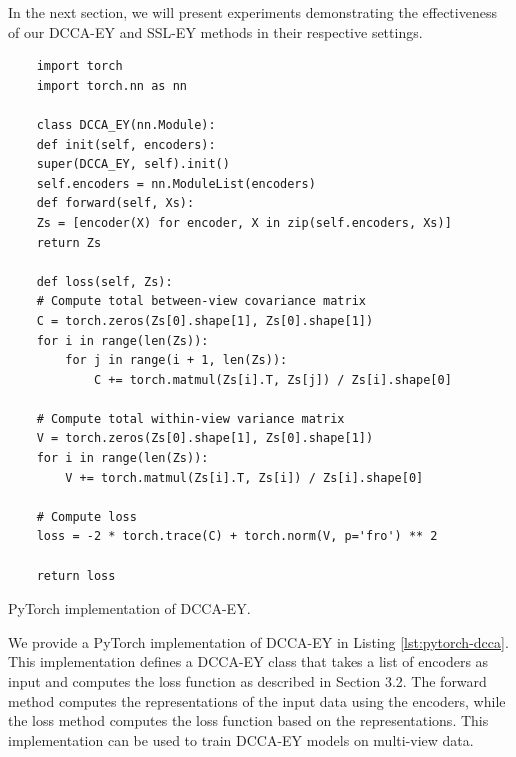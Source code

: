 In the next section, we will present experiments demonstrating the effectiveness of our DCCA-EY and SSL-EY methods in their respective settings.

\begin{listing}[ht]
    \begin{verbatim}
    import torch
    import torch.nn as nn
    
    class DCCA_EY(nn.Module):
    def init(self, encoders):
    super(DCCA_EY, self).init()
    self.encoders = nn.ModuleList(encoders)
    def forward(self, Xs):
    Zs = [encoder(X) for encoder, X in zip(self.encoders, Xs)]
    return Zs

    def loss(self, Zs):
    # Compute total between-view covariance matrix
    C = torch.zeros(Zs[0].shape[1], Zs[0].shape[1])
    for i in range(len(Zs)):
        for j in range(i + 1, len(Zs)):
            C += torch.matmul(Zs[i].T, Zs[j]) / Zs[i].shape[0]
    
    # Compute total within-view variance matrix
    V = torch.zeros(Zs[0].shape[1], Zs[0].shape[1])
    for i in range(len(Zs)):
        V += torch.matmul(Zs[i].T, Zs[i]) / Zs[i].shape[0]
    
    # Compute loss
    loss = -2 * torch.trace(C) + torch.norm(V, p='fro') ** 2
    
    return loss
    \end{verbatim}
    \caption{PyTorch implementation of DCCA-EY.}
    \label{lst:pytorch-dcca}
\end{listing}

We provide a PyTorch implementation of DCCA-EY in Listing \ref{lst:pytorch-dcca}. This implementation defines a DCCA-EY class that takes a list of encoders as input and computes the loss function as described in Section 3.2. The forward method computes the representations of the input data using the encoders, while the loss method computes the loss function based on the representations. This implementation can be used to train DCCA-EY models on multi-view data.

